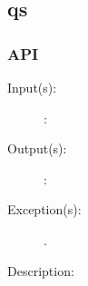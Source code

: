%
%
%
%
%              

\subsection{qs}
\label{qs}

\subsubsection{API}
\begin{description}
\label{qs_}
\item[{\cfunc[]{qs\_}{}}: ]
	\begin{description}\item[]
	\item[Input(s): ]
		\begin{description}\item[]
		\item[: ]
		\end{description}
	\item[Output(s): ]
		\begin{description}\item[]
		\item[: ]
		\end{description}
	\item[Exception(s): ]
		\begin{description}\item[]
		\item[.]
		\end{description}
	\item[Description: ]
	\end{description}
\end{description}
